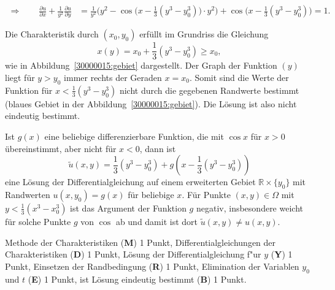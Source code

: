 \begin{loesung}
\begin{teilaufgaben}
\begin{align*}
\Rightarrow
\qquad
\frac{\partial u}{\partial x}
+
\frac1{y^2}
\frac{\partial u}{\partial y}
&=
\frac1{y^2}\biggl(y^2 -
\cos\bigl(x-{\textstyle\frac13}(y^3-y_0^3)\bigr)
\cdot y^2\biggr)
+
\cos\bigl(x-{\textstyle\frac13}(y^3-y_0^3)\bigr)
=1.
\end{align*}
\item
Die Charakteristik durch $(x_0,y_0)$ erfüllt im Grundriss die Gleichung
\[
x(y)
=
x_0 + {\textstyle\frac13}(y^3-y_0^3)
\ge
x_0,
\]
wie in Abbildung~\ref{30000015:gebiet} dargestellt.
Der Graph der Funktion $(y)$ liegt für $y>y_0$ immer rechts der
Geraden $x=x_0$.
Somit sind die Werte der Funktion für $x < {\textstyle\frac13}(y^3-y_0^3)$
nicht durch die gegebenen Randwerte bestimmt (blaues Gebiet in der
Abbildung~\ref{30000015:gebiet}).
Die Lösung ist also nicht eindeutig bestimmt.
\qedhere
\end{teilaufgaben}
\end{loesung}

\begin{diskussion}
Ist $g(x)$ eine beliebige differenzierbare Funktion, die mit $\cos x$ 
für $x>0$ übereinstimmt, aber nicht für $x<0$, dann ist
\[
\tilde u(x,y) = {\textstyle\frac13}(y^3-y_0^3) + g(x-{\textstyle\frac13}(y^3-y_0^3))
\]
eine Lösung der Differentialgleichung auf einem erweiterten Gebiet
$\mathbb R \times \{y_0\}$ mit Randwerten $u(x, y_0)=g(x)$ für beliebige $x$.
Für Punkte $(x,y)\in\Omega$ mit $y<{\textstyle\frac13}(x^3-x_0^3)$
ist das Argument
der Funktion $g$ negativ, insbesondere weicht für solche Punkte $g$ von
$\cos$ ab und damit ist dort $\tilde u(x,y)\ne u(x,y)$.
\end{diskussion}

\begin{bewertung}
Methode der Charakteristiken ({\bf M}) 1 Punkt,
Differentialgleichungen der Charakteristiken ({\bf D}) 1 Punkt,
Lösung der Differentialgleichung f"ur $y$ ({\bf Y}) 1 Punkt,
Einsetzen der Randbedingung ({\bf R}) 1 Punkt,
Elimination der Variablen $y_0$ und $t$ ({\bf E}) 1 Punkt,
ist Lösung eindeutig bestimmt ({\bf B}) 1 Punkt.
\end{bewertung}




